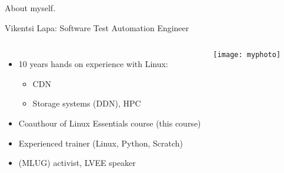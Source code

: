 \begin{frame}{About myself.}

    Vikentsi Lapa: Software Test Automation Engineer
    \begin{columns}
            \begin{itemize}
                \item 10 years hands on experience with Linux:
                \begin{itemize}
                    \item CDN
                    \item Storage systems (DDN), HPC 
                \end{itemize}
                \item Coauthour of Linux Essentials course (this course)
                \item Experienced trainer (Linux, Python, Scratch) 
                \item (MLUG) activist, LVEE speaker
            \end{itemize}
            \center\texttt{[image: myphoto]}
    \end{columns}
\end{frame}
